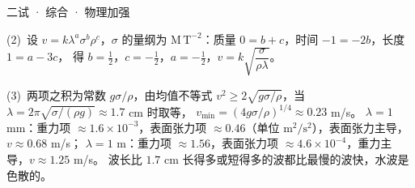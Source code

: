 \documentclass[cjk=noto, seal=first]{mojing-exam}
\begin{document}
\begin{paper}[time={建议 1.5 小时（训练设置）}, full=100]{二试 · 综合 · 物理加强}
\begin{questions}
\begin{solution}
(2)~设 $v=k\lambda^a\sigma^b\rho^c$，$\sigma$ 的量纲为 $\mathrm{M\,T^{-2}}$：质量 $0=b+c$，时间 $-1=-2b$，长度 $1=a-3c$，
得 $b=\frac12$，$c=-\frac12$，$a=-\frac12$，$v=k\sqrt{\dfrac{\sigma}{\rho\lambda}}$。

(3)~两项之积为常数 $g\sigma/\rho$，由均值不等式 $v^2\ge2\sqrt{g\sigma/\rho}$，当 $\lambda=2\pi\sqrt{\sigma/(\rho g)}\approx1.7$ cm 时取等，
$v_{\min}=(4g\sigma/\rho)^{1/4}\approx0.23$ m/s。
$\lambda=1$ mm：重力项 $\approx1.6\times10^{-3}$，表面张力项 $\approx0.46$（单位 $\mathrm{m^2/s^2}$），表面张力主导，$v\approx0.68$ m/s；
$\lambda=1$ m：重力项 $\approx1.56$，表面张力项 $\approx4.6\times10^{-4}$，重力主导，$v\approx1.25$ m/s。
波长比 $1.7$ cm 长得多或短得多的波都比最慢的波快，水波是色散的。
\end{solution}

\end{questions}
\end{paper}
\end{document}
